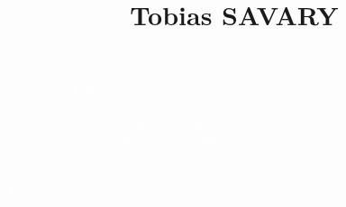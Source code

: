 \documentclass[9pt, oneside, a4paper, titlepage]{extarticle}
\title{Tobias SAVARY}
\date{}
\begin{document}
    
    \begin{tcolorbox}
        \begin{minipage}{0.3\linewidth}
            \hspace*{1cm}
        \end{minipage}%
        \hspace{1cm}%
        \begin{minipage}{0.6\linewidth}
            \begin{center}
                \Huge{\textcolor{white}{Tobias SAVARY}} \\
                \vspace*{0.5cm}
                
                \Large{\textcolor{white}{Candidature pour le stage \emph{Développements \\ PowerApps - Power BI (Ref. 2024-005232)} \\ à partir de février 2025\\}}
                \vspace*{0.5cm}
                \Large{\textcolor{white}{\emph{Etudiant en Génie Informatique \\Université de Technologie de Compiègne (UTC) \\}}}
            \end{center}
        \end{minipage}%
    \end{tcolorbox}
\end{document}
